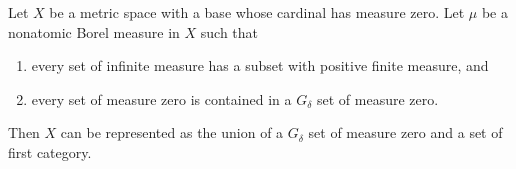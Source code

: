 Let $X$ be a metric space with a base whose cardinal has measure zero. Let $\mu$ be a nonatomic Borel measure in $X$ such that
\begin{enumerate}
\item every set of infinite measure has a subset with positive finite measure, and
\item every set of measure zero is contained in a $G_\delta$ set of measure zero.
\end{enumerate}
Then $X$ can be represented as the union of a $G_\delta$ set of measure zero and a set of first category.
